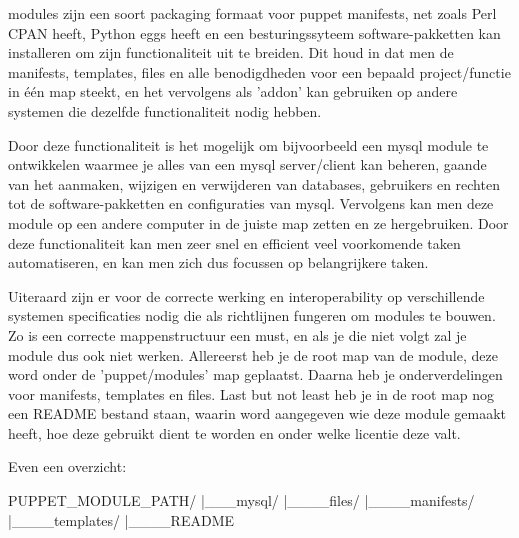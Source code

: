 
modules zijn een soort packaging formaat voor puppet manifests, net zoals Perl CPAN heeft, Python eggs heeft en een besturingssyteem software-pakketten kan installeren om zijn functionaliteit uit te breiden.
Dit houd in dat men de manifests, templates, files en alle benodigdheden voor een bepaald project/functie in één map steekt, en het vervolgens als 'addon' kan gebruiken op andere systemen die dezelfde functionaliteit nodig hebben.

Door deze functionaliteit is het mogelijk om bijvoorbeeld een mysql module te ontwikkelen waarmee je alles van een mysql server/client kan beheren, gaande van het aanmaken, wijzigen en verwijderen van databases, gebruikers en rechten tot de software-pakketten en configuraties van mysql.
Vervolgens kan men deze module op een andere computer in de juiste map zetten en ze hergebruiken.
Door deze functionaliteit kan men zeer snel en efficient veel voorkomende taken automatiseren, en kan men zich dus focussen op belangrijkere taken.

Uiteraard zijn er voor de correcte werking en interoperability op verschillende systemen specificaties nodig die als richtlijnen fungeren om modules te bouwen.
Zo is een correcte mappenstructuur een must, en als je die niet volgt zal je module dus ook niet werken.
Allereerst heb je de root map van de module, deze word onder de 'puppet/modules' map geplaatst.
Daarna heb je onderverdelingen voor manifests, templates en files. Last but not least heb je in de root map nog een README bestand staan, waarin word aangegeven wie deze module gemaakt heeft, hoe deze gebruikt dient te worden en onder welke licentie deze valt.

Even een overzicht:

PUPPET_MODULE_PATH/
|___mysql/
	|____files/
        |____manifests/
	|____templates/
	|____README
